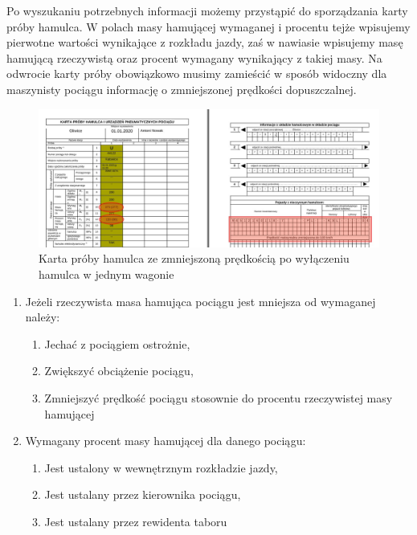 Po wyszukaniu potrzebnych informacji możemy przystąpić do sporządzania karty próby hamulca. W polach masy hamującej wymaganej i procentu tejże wpisujemy pierwotne wartości wynikające z rozkładu jazdy, zaś w nawiasie wpisujemy masę hamującą rzeczywistą oraz procent wymagany wynikający z takiej masy. Na odwrocie karty próby obowiązkowo musimy zamieścić w sposób widoczny dla maszynisty pociągu informację o zmniejszonej prędkości dopuszczalnej.
\begin{figure}
	\includegraphics[width=13cm]{skryptkierownik-img/karta-proby-wylaczony-hamulec.jpg}
	\caption{Karta próby hamulca ze zmniejszoną prędkością po wyłączeniu hamulca w jednym wagonie}
\end{figure}
\begin{tcolorbox}[colback=black!5!white,colframe=white!55!black,title=Sprawdźmy się]
	\begin{enumerate}
		\item Jeżeli rzeczywista masa hamująca pociągu jest mniejsza od wymaganej należy:
		\begin{enumerate}
			\item Jechać z pociągiem ostrożnie,
			\item Zwiększyć obciążenie pociągu,
			\item Zmniejszyć prędkość pociągu stosownie do procentu rzeczywistej masy hamującej
		\end{enumerate}
		\item Wymagany procent masy hamującej dla danego pociągu:
		\begin{enumerate}
			\item Jest ustalony w wewnętrznym rozkładzie jazdy,
			\item Jest ustalany przez kierownika pociągu,
			\item Jest ustalany przez rewidenta taboru
		\end{enumerate}
	\end{enumerate}
\end{tcolorbox}	

